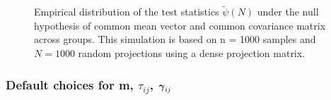 \documentclass[APA,Times1COL]{WileyNJDv5} %
\newcommand{\ugamma}            {\mbox{\boldmath$\gamma$}}
\begin{document}
\begin{figure}[H]
  \centering
{}
\caption{Empirical distribution of the test statistics $\widetilde{\psi}(N)$ under the null hypothesis of common mean vector and common covariance matrix across groups. This simulation is based on n = 1000 samples and $N = 1000$ random projections using a dense projection matrix.}
  \label{fig:BFh0}
\end{figure}
  
\subsubsection{Default choices for m, $\tau_{ij}$, $\ugamma_{ij}$} \label{sec:mtaugam}
\end{document}
